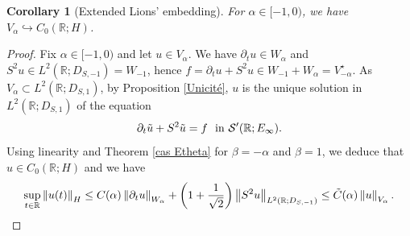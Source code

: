 \documentclass[11pt, letterpaper]{amsart}
\newtheorem{cor}[thm]{Corollary}
\theoremstyle{definition}
\theoremstyle{remark}
\numberwithin{equation}{section}
\begin{document}
\begin{cor}[Extended Lions' embedding]
    For $\alpha \in [-1,0)$, we have $V_\alpha \hookrightarrow C_0(\mathbb{R};H)$.
\end{cor}
\begin{proof}
    Fix $\alpha \in [-1,0)$ and let $u \in V_\alpha$. We have $\partial_t u \in W_\alpha$ and $S^2u \in L^2(\mathbb{R};D_{S,-1})=W_{-1}$, hence $f=\partial_t u+ S^2u \in W_{-1}+W_{\alpha}= V_{-\alpha}^\star$. As $V_\alpha\subset L^2(\mathbb{R};D_{S,1})$, by Proposition \ref{Unicité},  $u$ is the unique solution in $L^2(\mathbb{R};D_{S,1})$ of the equation 
\begin{equation*}
    \partial_t \Tilde{u} +S^2 \Tilde{u} = f \ \ \mathrm{in} \ \mathcal{S}'(\mathbb{R};E_\infty).
\end{equation*} Using linearity and Theorem \ref{cas Etheta} for $\beta=-\alpha$ and $\beta=1$, we deduce that  $u \in C_0(\mathbb{R};H)$ and we have 
\begin{align*}
    \sup_{t \in \mathbb{R}} \left\| u(t)\right\|_H \leq C(\alpha) \left\|\partial_t u \right\|_{ W_\alpha}+\left ( 1+\frac{1}{\sqrt{2}} \right ) \left \| S^2u \right \|_{L^2(\mathbb{R};D_{S,-1})} \leq \Tilde{C}(\alpha) \left \| u \right \|_{V_\alpha}.
\end{align*}
\end{proof} 
\end{document}
